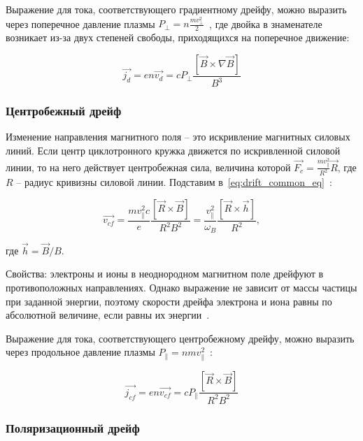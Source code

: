 \documentclass[10pt, a4paper]{article}
\begin{document}
Выражение для тока, соответствующего градиентному дрейфу, можно выразить через поперечное давление плазмы $P_\perp = n\frac{mv_\perp^2}{2}$~\cite{frank}, где двойка в знаменателе возникает из-за двух степеней свободы, приходящихся на поперечное движение:

\begin{equation*}
	\overrightarrow{j_d} = en\overrightarrow{v_d} = cP_\perp\frac{\left[\vec{B}\times\nabla\vec{B}\right]}{B^3}
\end{equation*}

\subsubsection{Центробежный дрейф}

Изменение направления магнитного поля -- это искривление магнитных силовых линий.
Если центр циклотронного кружка движется по искривленной
силовой линии, то на него действует
центробежная сила, величина которой
$\vec{F_c} = \frac{mv_\parallel^2}{R^2}\vec{R}$, где $R$ -- радиус кривизны силовой линии. Подставим в~\eqref{eq:drift_common_eq}~\cite{frank}:

\begin{equation*}
	\overrightarrow{v_{cf}} = \frac{mv_\parallel^2c}{e}\frac{\left[\vec{R}\times\vec{B}\right]}{R^2B^2}=\frac{v_\parallel^2}{\omega_B}\frac{\left[\vec{R}\times\vec{h}\right]}{R^2},
\end{equation*}

где $\vec{h} = \vec{B}/B$.

Свойства: электроны и ионы в неоднородном магнитном поле дрейфуют в противоположных направлениях. Однако выражение не зависит от массы частицы при заданной энергии, поэтому скорости дрейфа электрона и иона равны по абсолютной величине, если равны их энергии~\cite{kotelnikov}.

Выражение для тока, соответствующего центробежному дрейфу, можно выразить через продольное давление плазмы $P_\parallel = nmv_\parallel^2$~\cite{frank}:

\begin{equation*}
	\overrightarrow{j_{cf}} = en\overrightarrow{v_{cf}} = cP_\parallel\frac{\left[\vec{R}\times\vec{B}\right]}{R^2B^2}
\end{equation*}

\subsubsection{Поляризационный дрейф}
\end{document}
